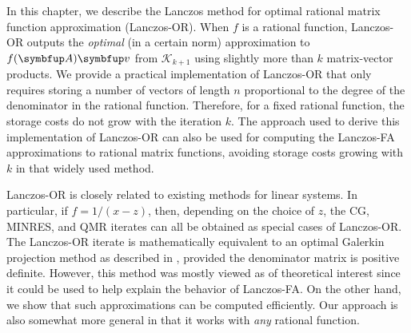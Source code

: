 In this chapter, we describe the Lanczos method for optimal rational matrix function approximation (Lanczos-OR).
When $f$ is a rational function, Lanczos-OR outputs the \emph{optimal} (in a certain norm) approximation to $\fA\vec{v}$ from $\mathcal{K}_{k+1}$ using slightly more than $k$ matrix-vector products.
We provide a practical implementation of Lanczos-OR that
only requires storing a number of vectors of length $n$ proportional to the degree of the denominator in the rational function.
Therefore, for a fixed rational function, the storage costs do not grow with the iteration $k$. The approach used to derive this implementation of Lanczos-OR can also be used for computing the Lanczos-FA approximations to rational matrix functions, avoiding storage costs growing with $k$ in that widely used method.


Lanczos-OR is closely related to existing methods for linear systems. 
In particular, if $f = 1/(x-z)$, then, depending on the choice of $z$, the CG, MINRES, and QMR iterates can all be obtained as special cases of Lanczos-OR.
The Lanczos-OR iterate is mathematically equivalent to an optimal Galerkin projection method as described in \cite[Section 4]{lopez_simoncini_06}, provided the denominator matrix is positive definite. 
However, this method was mostly viewed as of theoretical interest since it could be used to help explain the behavior of Lanczos-FA. 
On the other hand, we show that such approximations can be computed efficiently.
Our approach is also somewhat more general in that it works with \emph{any} rational function.



